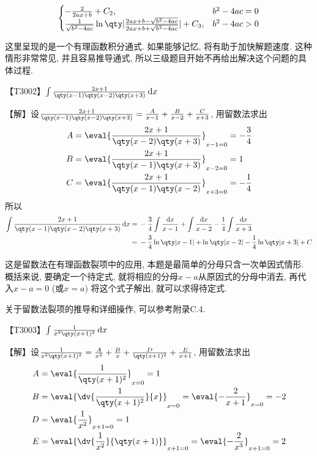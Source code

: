 \documentclass{ctexbook}
\newcommand*{\dif}{\mathop{}\!\mathrm{d}}
\begin{document}
{\begin{align*}
\begin{cases}
-\frac{2}{2ax+b}+C_{2},&b^{2}-4ac=0\\
\frac{1}{\sqrt{b^{2}-4ac}}\ln\qty|\frac{2ax+b-\sqrt{b^{2}-4ac}}{2ax+b+\sqrt{b^{2}-4ac}}|+C_{3},&b^{2}-4ac>0
\end{cases}
\end{align*}\par
{\kaishu 这里呈现的是一个有理函数积分通式. 如果能够记忆, 将有助于加快解题速度. 这种情形非常常见, 并且容易推导通式, 所以三级题目开始不再给出解决这个问题的具体过程. \par}
{\color{red}【T3002】}$\int\frac{2x+1}{\qty(x-1)\qty(x-2)\qty(x+3)}\dif{x}$\par
【解】设$\frac{2x+1}{\qty(x-1)\qty(x-2)\qty(x+3)}=\frac{A}{x-1}+\frac{B}{x-2}+\frac{C}{x+3}$, 用留数法求出
\begin{align*}
A={}&\eval{\frac{2x+1}{\qty(x-2)\qty(x+3)}}_{x-1=0}=-\frac{3}{4}\\
B={}&\eval{\frac{2x+1}{\qty(x-1)\qty(x+3)}}_{x-2=0}=1\\
C={}&\eval{\frac{2x+1}{\qty(x-1)\qty(x-2)}}_{x+3=0}=-\frac{1}{4}
\end{align*}
所以
\begin{align*}
\int\frac{2x+1}{\qty(x-1)\qty(x-2)\qty(x+3)}\dif{x}={}&-\frac{3}{4}\int\frac{\dif{x}}{x-1}+\int\frac{\dif{x}}{x-2}-\frac{1}{4}\int\frac{\dif{x}}{x+3}\\
={}&-\frac{3}{4}\ln\qty|x-1|+\ln\qty|x-2|-\frac{1}{4}\ln\qty|x+3|+C
\end{align*}\par
{\kaishu 这是留数法在有理函数裂项中的应用, 本题是最简单的分母只含一次单因式情形. 概括来说, 要确定一个待定式, 就将相应的分母$x-a$从原因式的分母中消去, 再代入$x-a=0$ (或$x=a$) 将这个式子解出, 就可以求得待定式. \par
关于留数法裂项的推导和详细操作, 可以参考附录C.4. \par}
{\color{red}【T3003】}$\int\frac{1}{x^{2}\qty(x+1)^{2}}\dif{x}$\par
【解】设$\frac{1}{x^{2}\qty(x+1)^{2}}=\frac{A}{x^{2}}+\frac{B}{x}+\frac{D}{\qty(x+1)^{2}}+\frac{E}{x+1}$, 用留数法求出
\begin{align*}
A={}&\eval{\frac{1}{\qty(x+1)^{2}}}_{x=0}=1\\
B={}&\eval{\dv{\frac{1}{\qty(x+1)^{2}}}{x}}_{x=0}=\eval{-\frac{2}{x+1}}_{x=0}=-2\\
D={}&\eval{\frac{1}{x^{2}}}_{x+1=0}=1\\
E={}&\eval{\dv{\frac{1}{x^{2}}}{\qty(x+1)}}_{x+1=0}=\eval{-\frac{2}{x^{3}}}_{x+1=0}=2
\end{align*}
}
\end{document}
